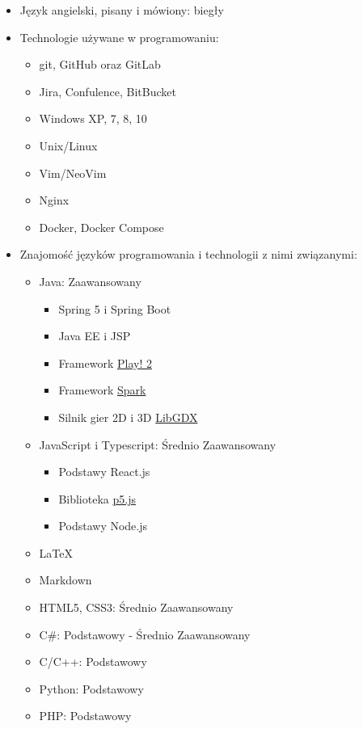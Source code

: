 \documentclass[letterpaper,11pt]{article}
\begin{document}
\begin{itemize}
	\item Język angielski, pisany i mówiony: biegły
	\item Technologie używane w programowaniu:
	\begin{itemize}
		\item git, GitHub oraz GitLab
		\item Jira, Confulence, BitBucket
		\item Windows XP, 7, 8, 10
		\item Unix/Linux
		\item Vim/NeoVim
		\item Nginx
		\item Docker, Docker Compose
	\end{itemize}
	\item Znajomość języków programowania i technologii z nimi związanymi:
		\begin{itemize}
			\item Java: Zaawansowany
				\begin{itemize}
					\item Spring 5 i Spring Boot
					\item Java EE i JSP
					\item Framework \href{https://playframework.com}{Play! 2}
					\item Framework \href{https://sparkjava.com}{Spark}
					\item Silnik gier 2D i 3D \href{https://libgdx.badlogicgames.com/}{LibGDX}
				\end{itemize}
			\item JavaScript i Typescript: Średnio Zaawansowany
				\begin{itemize}
					\item Podstawy React.js
					\item Biblioteka \href{https://p5js.org/}{p5.js}
					\item Podstawy Node.js
				\end{itemize}
			\item \LaTeX
			\item Markdown
			\item HTML5, CSS3: Średnio Zaawansowany
			\item C\#: Podstawowy - Średnio Zaawansowany
			\item C/C++: Podstawowy
			\item Python: Podstawowy
			\item PHP: Podstawowy
		\end{itemize}
\end{itemize}
\end{document}
